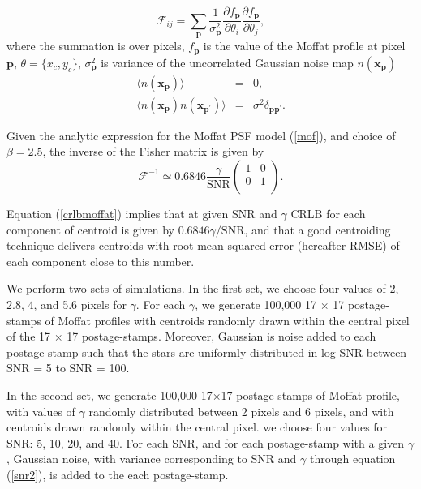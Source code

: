 \documentclass[12pt, preprint]{aastex}
\newcommand{\beq}{\begin{equation}}
\newcommand{\eeq}{\end{equation}}
\begin{document}
\beq
  \mathcal{F}_{ij} = \sum_{\mathbf{p}}\frac{1}{\sigma_{\mathbf{p}}^{2}}
                \frac{\partial f_{\mathbf{p}}}{\partial \theta_{i}}\frac{\partial f_{\mathbf{p}}}{\partial \theta_{j}},
\label{fish}
\eeq
where the summation is over pixels, $f_{\mathbf{p}}$ is the value of the Moffat profile at pixel $\mathbf{p}$,
$\theta=\{x_{c},y_{c}\}$, $\sigma_{\mathbf{p}}^{2}$ is variance
of the uncorrelated Gaussian noise map $n(\mathbf{x_{p}})$
\begin{eqnarray}
\langle n(\mathbf{x_{p}}) \rangle &=& 0, \\
\langle n(\mathbf{x_{p}})n(\mathbf{x_{p^{\prime}}}) \rangle &=& \sigma^{2}\delta_{\mathbf{p}\mathbf{p}^{\prime}}. 
\end{eqnarray}

Given the analytic expression for the Moffat PSF model (\ref{mof}), and choice of $\beta=2.5$, 
the inverse of the Fisher matrix is given by
\beq
  \mathcal{F}^{-1} \simeq 0.6846 \frac{\gamma}{\text{SNR}} 
  \begin{pmatrix}
      1 & 0\\
      0 & 1\\
  \end{pmatrix}.
\label{crlbmoffat}
\eeq

Equation (\ref{crlbmoffat}) implies that at given SNR and $\gamma$
CRLB for each component of centroid is given by $0.6846\gamma/\text{SNR}$,
and that a good centroiding technique delivers centroids with
root-mean-squared-error (hereafter RMSE) of each component close to
this number. 

We perform two sets of simulations. In the first set, we choose four values of
2, 2.8, 4, and 5.6 pixels for $\gamma$. For each $\gamma$, we generate 100,000 
17 $\times$ 17 postage-stamps of Moffat profiles with centroids randomly drawn
within the central pixel of the 17 $\times$ 17 postage-stamps. Moreover, Gaussian
is noise added to each postage-stamp such that the stars are uniformly distributed
in log-SNR between SNR = 5 to SNR = 100.

In the second set, we generate 100,000 17$\times$17 postage-stamps
of Moffat profile, with values of $\gamma$ randomly distributed 
between 2 pixels and 6 pixels, and with centroids drawn randomly within 
the central pixel. we choose four values for SNR: 5, 10, 20, and 40. 
For each SNR, and for each postage-stamp with a given $\gamma$, 
Gaussian noise, with variance corresponding to SNR and $\gamma$ through equation 
(\ref{snr2}), is added to the each postage-stamp.
\end{document}

